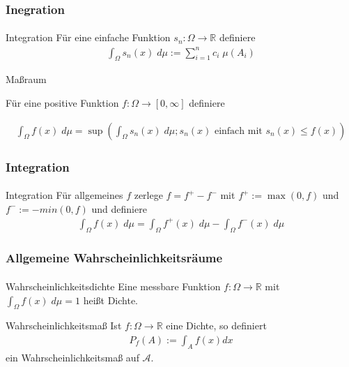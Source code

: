 \documentclass{beamer}
\begin{document}
\begin{frame}
    \frametitle{Inegration}
\framesubtitle{}

\begin{block}{Integration}
Für eine einfache Funktion   $s_n : \Omega \to \mathbb{R}$  definiere
\begin{align*}
\int_\Omega s_n(x) \;  d\mu := \sum_{i=1}^{n} c_i \; \mu(A_i)
\end{align*}
\end{block}
\begin{block}{Maßraum}

Für eine positive Funktion $f: \Omega \to [0, \infty]$ definiere

\begin{align*}
\int_\Omega f(x) \;  d \mu = \sup( \int_\Omega s_n(x) \;  d\mu ; s_n(x) \text{ einfach mit } s_n(x) \leq f(x))
\end{align*}
\end{block}
 \end{frame}



\begin{frame}
    \frametitle{Integration}
\framesubtitle{}

\begin{block}{Integration}
Für allgemeines $f$ zerlege $f = f^+ - f^-$ mit $f^+ := \max(0, f)$ und $f^- := -min(0, f)$ und definiere 
\begin{align*}
\int_\Omega f(x) \;  d\mu  = \int_\Omega f^+(x) \;  d\mu - \int_\Omega f^-(x) \;  d\mu
\end{align*}

\end{block}


 \end{frame}


\begin{frame}
    \frametitle{Allgemeine Wahrscheinlichkeitsräume}
\framesubtitle{}
\begin{block}{Wahrscheinlichkeitsdichte}
Eine messbare Funktion $f: \Omega  \to \mathbb{R}$ mit $\int_{\Omega} f(x) \; d\mu = 1$ heißt Dichte.
\end{block}
\begin{block}{Wahrscheinlichkeitsmaß}
Ist $f: \Omega  \to \mathbb{R}$ eine Dichte, so definiert 
\begin{align*}
P_f (A) := \int_{A} f (x) dx
\end{align*}
 ein Wahrscheinlichkeitsmaß auf $\mathcal{A}$.
\end{block}
 \end{frame}
\end{document}
